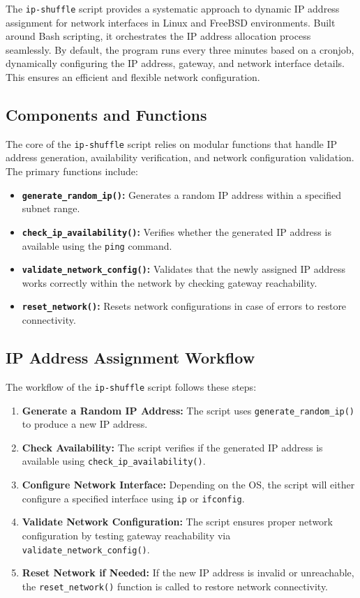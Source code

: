 The \texttt{ip-shuffle} script provides a systematic approach to dynamic IP address assignment for network interfaces in Linux and FreeBSD environments. Built around Bash scripting, it orchestrates the IP address allocation process seamlessly. By default, the program runs every three minutes based on a cronjob, dynamically configuring the IP address, gateway, and network interface details. This ensures an efficient and flexible network configuration.

\subsection{Components and Functions}
The core of the \texttt{ip-shuffle} script relies on modular functions that handle IP address generation, availability verification, and network configuration validation. The primary functions include:
\begin{itemize}
    \item \textbf{\texttt{generate\_random\_ip()}:}  
        Generates a random IP address within a specified subnet range.
    \item \textbf{\texttt{check\_ip\_availability()}:}  
        Verifies whether the generated IP address is available using the \texttt{ping} command.    
    \item \textbf{\texttt{validate\_network\_config()}:}  
        Validates that the newly assigned IP address works correctly within the network by checking gateway reachability.
    \item \textbf{\texttt{reset\_network()}:}  
        Resets network configurations in case of errors to restore connectivity.
\end{itemize}

\subsection{IP Address Assignment Workflow}
The workflow of the \texttt{ip-shuffle} script follows these steps:
\begin{enumerate}
    \item \textbf{Generate a Random IP Address:} 
    	The script uses \texttt{generate\_random\_ip()} to produce a new IP address.
    \item \textbf{Check Availability:} 
    	The script verifies if the generated IP address is available using \texttt{check\_ip\_availability()}.
    \item \textbf{Configure Network Interface:}
    	Depending on the OS, the script will either configure a specified interface using \texttt{ip} or \texttt{ifconfig}.
    \item \textbf{Validate Network Configuration:}
    	The script ensures proper network configuration by testing gateway reachability via \texttt{validate\_network\_config()}.
    \item \textbf{Reset Network if Needed:} 
    	If the new IP address is invalid or unreachable, the \texttt{reset\_network()} function is called to restore network connectivity.
\end{enumerate}

